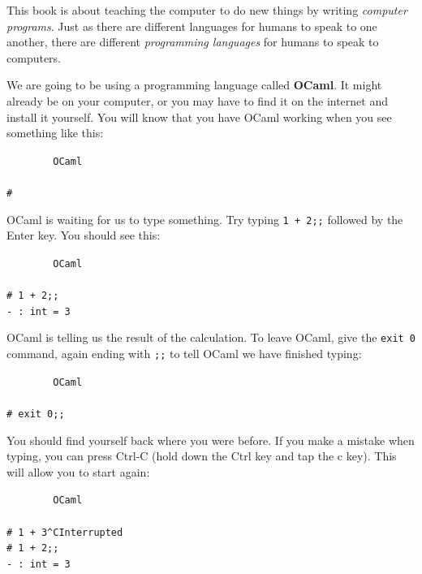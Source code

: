\documentclass[]{book}
\newcommand{\smspace}{\vspace{4mm}}
\begin{document}
This book is about teaching the computer to do new things by writing \textit{computer programs}. Just as there are different languages for humans to speak to one another, there are different \textit{programming languages} for humans to speak to computers.

We are going to be using a programming language called \textbf{OCaml}. It might already be on your computer, or you may have to find it on the internet and install it yourself. You will know that you have OCaml working when you see something like this:

\smspace
\noindent\verb!        OCaml!\\
\noindent\\
\noindent\verb!#!
\smspace


{\setlength\fboxsep{1.75pt}%

\noindent OCaml is waiting for us to type something. Try typing \texttt{1 + 2;;} followed by the Enter key. You should see this:

}

\smspace
\noindent\verb!        OCaml!\\
\noindent\\
\noindent\verb!# 1 + 2;;!\\
\noindent\verb!- : int = 3!
\smspace

\noindent OCaml is telling us the result of the calculation. To leave OCaml, give the \texttt{exit 0} command, again ending with \verb!;;! to tell OCaml we have finished typing:

\smspace
\noindent\verb!        OCaml!\\
\noindent\\
\noindent\verb!# exit 0;;!
\smspace

{\setlength\fboxsep{1.75pt}%

\noindent You should find yourself back where you were before. If you make a mistake when typing, you can press Ctrl-C (hold down the Ctrl key and tap the c key). This will allow you to start again:

}

\smspace
\noindent\verb!        OCaml!\\
\noindent\\
\noindent\verb!# 1 + 3^CInterrupted!\\
\noindent\verb!# 1 + 2;;!\\
\noindent\verb!- : int = 3!
\smspace
\end{document}
